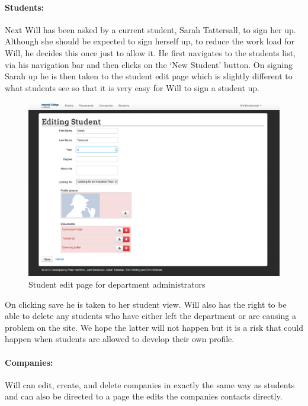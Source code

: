   \paragraph{Students:}
    Next Will has been asked by a current student, Sarah Tattersall, to sign her up. Although she should be expected to sign herself up, to reduce the work load for Will, he decides this once just to allow it.
    He first navigates to the students list, via his navigation bar and then clicks on the `New Student' button.
    On signing Sarah up he is then taken to the student edit page which is slightly different to what students see so that it is very easy for Will to sign a student up.

    \begin{figure}[H]\centering
    \includegraphics[scale=0.5]{images/user_experiences/admin/admin_student_edit}
    \caption{Student edit page for department administrators}
    \end{figure}

    On clicking save he is taken to her student view. Will also has the right to be able to delete any students who have either left the department or are causing a problem on the site. We hope the latter will not happen but it is a risk that could happen when students are allowed to develop their own profile.

  \paragraph{Companies:}
    Will can edit, create, and delete companies in exactly the same way as students and can also be directed to a page the edits the companies contacts directly. 

